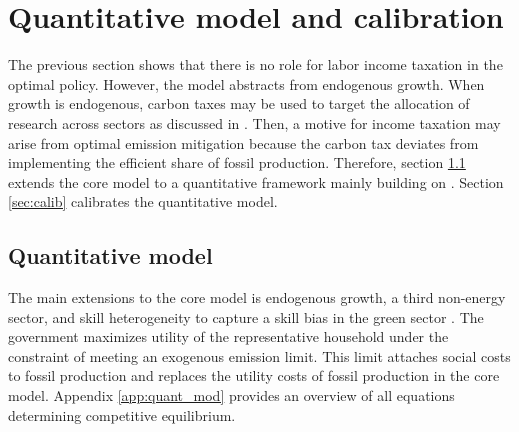\section{Quantitative model and calibration}\label{sec:model}

The previous section shows that there is no role for labor income taxation in the optimal policy. However, the model abstracts from endogenous growth. When growth is endogenous, carbon taxes may be used to target the allocation of research across sectors as discussed in \cite{Acemoglu2012TheChange}. Then, a motive for income taxation may arise from optimal emission mitigation because the carbon tax deviates from implementing the efficient share of fossil production. 
Therefore, section \ref{sec_quantmod} extends the core model to a quantitative framework mainly building on \cite{Fried2018ClimateAnalysis}. Section \ref{sec:calib} calibrates the quantitative model. 

\subsection{Quantitative model}\label{sec_quantmod}


The main extensions to the core model is endogenous growth, a third non-energy sector, and skill heterogeneity to capture a skill bias in the green sector \citep{Consoli2016DoCapital}. 
The government maximizes utility of the representative household under the constraint of meeting an exogenous emission limit. This limit attaches social costs to fossil production and replaces the utility costs of fossil production in the core model. 
Appendix \ref{app:quant_mod} provides an overview of all equations determining competitive equilibrium.

